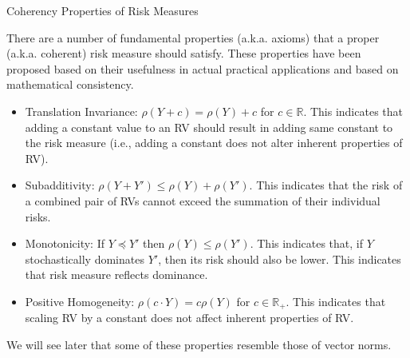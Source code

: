 \documentclass[9pt]{beamer}
\begin{document}
%
\begin{frame}{Coherency Properties of Risk Measures}

There are a number of fundamental properties (a.k.a. axioms) that a proper (a.k.a. coherent) risk measure should satisfy. These properties have been proposed based on their usefulness in actual practical applications and based on mathematical consistency. 
\begin{block}{}
\begin{itemize}
\item Translation Invariance: $\rho(Y+c)=\rho(Y)+c$ for $c\in \mathbb{R}$. This indicates that adding a constant value to an RV should result in adding same constant to the risk measure (i.e., adding a constant does not alter inherent properties of RV).
\item Subadditivity: $\rho(Y+Y')\leq \rho(Y)+\rho(Y')$. This indicates that the risk of a combined pair of RVs cannot exceed the summation of their individual risks. 
\item Monotonicity:  If $Y\preceq Y'$ then $\rho(Y)\leq \rho(Y')$. This indicates that, if $Y$ stochastically dominates $Y'$, then its risk should also be lower. This indicates that risk measure reflects dominance. 
\item Positive Homogeneity: $\rho(c\cdot Y)=c\rho(Y)$ for $c\in \mathbb{R}_+$. This indicates that scaling RV by a constant does not affect inherent properties of RV.
\end{itemize}
\end{block}
We will see later that some of these properties resemble those of vector norms. 

\end{frame}
\end{document}
